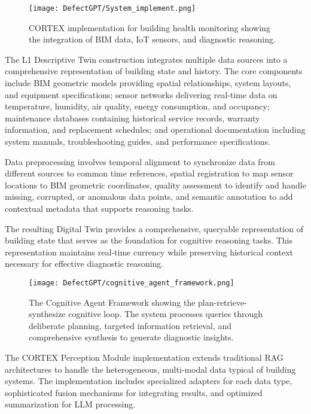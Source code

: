 \begin{figure}[htbp]
\centering
\texttt{[image: DefectGPT/System\_implement.png]}
\caption{CORTEX implementation for building health monitoring showing the integration of BIM data, IoT sensors, and diagnostic reasoning.}
\label{fig:system_implementation}
\end{figure}

The L1 Descriptive Twin construction integrates multiple data sources into a comprehensive representation of building state and history. The core components include BIM geometric models providing spatial relationships, system layouts, and equipment specifications; sensor networks delivering real-time data on temperature, humidity, air quality, energy consumption, and occupancy; maintenance databases containing historical service records, warranty information, and replacement schedules; and operational documentation including system manuals, troubleshooting guides, and performance specifications.

Data preprocessing involves temporal alignment to synchronize data from different sources to common time references, spatial registration to map sensor locations to BIM geometric coordinates, quality assessment to identify and handle missing, corrupted, or anomalous data points, and semantic annotation to add contextual metadata that supports reasoning tasks.

The resulting Digital Twin provides a comprehensive, queryable representation of building state that serves as the foundation for cognitive reasoning tasks. This representation maintains real-time currency while preserving historical context necessary for effective diagnostic reasoning.

\begin{figure}[htbp]
\centering
\texttt{[image: DefectGPT/cognitive\_agent\_framework.png]}
\caption{The Cognitive Agent Framework showing the plan-retrieve-synthesize cognitive loop. The system processes queries through deliberate planning, targeted information retrieval, and comprehensive synthesis to generate diagnostic insights.}
\label{fig:cognitive_agent_framework}
\end{figure}

The CORTEX Perception Module implementation extends traditional RAG architectures to handle the heterogeneous, multi-modal data typical of building systems. The implementation includes specialized adapters for each data type, sophisticated fusion mechanisms for integrating results, and optimized summarization for LLM processing.

